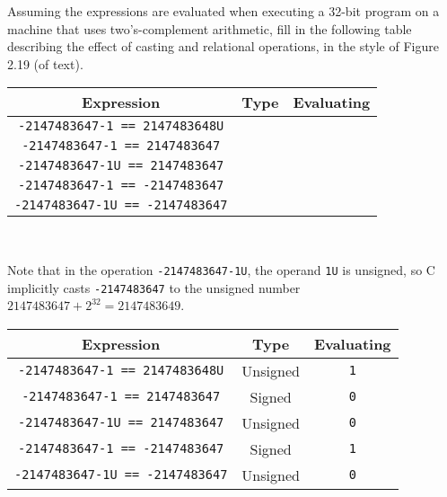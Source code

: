 \documentclass[12pt]{article}
\newenvironment{ex}[2][Exercise]{\begin{trivlist}
		\item[\hskip \labelsep {\bfseries #1}\hskip \labelsep {\bfseries #2.}]}{\end{trivlist}}
\newenvironment{sol}[1][Solution]{\begin{trivlist}
		\item[\hskip \labelsep {\bfseries #1:}]}{\end{trivlist}}
\begin{document}
\begin{ex}{2.21}
	Assuming the expressions are evaluated when executing a 32-bit program on a machine that uses
	two's-complement arithmetic, fill in the following table describing the effect of casting
	and relational operations, in the style of Figure 2.19 (of text).
		\begin{center}
		\begin{tabular}{ccc}
			\hline
			Expression & Type & Evaluating \\
			\hline
			\texttt{-2147483647-1 == 2147483648U} & \makebox[1cm]{\hrulefill} & \makebox[1cm]{\hrulefill}\\
			\texttt{-2147483647-1 == 2147483647} & \makebox[1cm]{\hrulefill} & \makebox[1cm]{\hrulefill}\\
			\texttt{-2147483647-1U == 2147483647} & \makebox[1cm]{\hrulefill} & \makebox[1cm]{\hrulefill}\\
			\texttt{-2147483647-1 == -2147483647} & \makebox[1cm]{\hrulefill} & \makebox[1cm]{\hrulefill}\\
			\texttt{-2147483647-1U == -2147483647} & \makebox[1cm]{\hrulefill} & \makebox[1cm]{\hrulefill}\\
		\end{tabular}
	\end{center}
\end{ex}

\begin{sol}
	\
	\begin{center}
		Note that in the operation \texttt{-2147483647-1U}, the operand \texttt{1U} is unsigned,
		so C implicitly casts \texttt{-2147483647} to the unsigned number $2147483647+2^{32}=2147483649$.
		\begin{tabular}{ccc}
			\hline
			Expression & Type & Evaluating \\
			\hline
			\texttt{-2147483647-1 == 2147483648U} & Unsigned & \texttt{1}\\
			\texttt{-2147483647-1 == 2147483647} & Signed & \texttt{0}\\
			\texttt{-2147483647-1U == 2147483647} & Unsigned & \texttt{0} \\
			\texttt{-2147483647-1 == -2147483647} & Signed & \texttt{1}\\
			\texttt{-2147483647-1U == -2147483647} & Unsigned & \texttt{0}\\
		\end{tabular}
	\end{center}
\end{sol}
\end{document}

